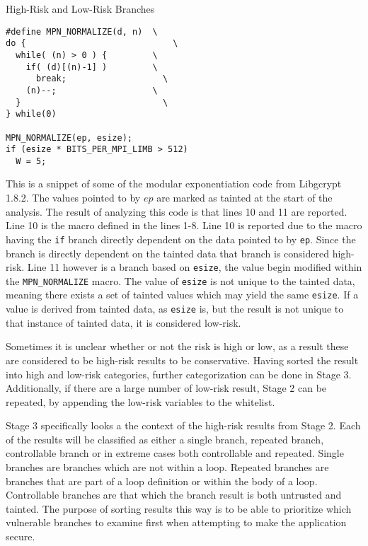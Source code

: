 \documentclass[11pt,a4paper]{article}
\begin{document}
\begin{algorithm}
  \caption{High-Risk and Low-Risk Branches}
\begin{lstlisting}
#define MPN_NORMALIZE(d, n)  \
do {		                     \
  while( (n) > 0 ) {         \
    if( (d)[(n)-1] )         \
      break;	               \
    (n)--;	                 \
  }		                       \
} while(0)

MPN_NORMALIZE(ep, esize);
if (esize * BITS_PER_MPI_LIMB > 512)
  W = 5;
\end{lstlisting}
  \label{alg:branch_risk_examples}
\end{algorithm}


This is a snippet of some of the modular exponentiation code from Libgcrypt
1.8.2. The values pointed to by $ep$ are marked as tainted at the start of the
analysis. The result of analyzing this code is that lines 10 and 11 are
reported. Line 10 is the macro defined in the lines 1-8. Line 10 is reported due
to the macro having the \texttt{if} branch directly dependent on the data
pointed to by \texttt{ep}. Since the branch is directly dependent on the tainted
data that branch is considered high-risk. Line 11 however is a branch based on
\texttt{esize}, the value begin modified within the \texttt{MPN\_NORMALIZE}
macro. The value of \texttt{esize} is not unique to the tainted data, meaning there
exists a set of tainted values which may yield the same \texttt{esize}. If a
value is derived from tainted data, as \texttt{esize} is, but the result is not
unique to that instance of tainted data, it is considered low-risk.

Sometimes it is unclear whether or not the risk is high or
low, as a result these are considered to be high-risk results to be
conservative. Having sorted the result into high and low-risk categories,
further categorization can be done in Stage 3. Additionally, if there are a
large number of low-risk result, Stage 2 can be repeated, by appending the
low-risk variables to the whitelist.

Stage 3 specifically looks a the context of the high-risk results from Stage 2.
Each of the results will be classified as either a single branch, repeated
branch, controllable branch or in extreme cases both controllable and repeated.
Single branches are branches which are not within a loop. Repeated branches are
branches that are part of a loop definition or within the body of a loop.
Controllable branches are that which the branch result is both untrusted and
tainted. The purpose of sorting results this way is to be able to prioritize
which vulnerable branches to examine first when attempting to make the
application secure.
\end{document}
